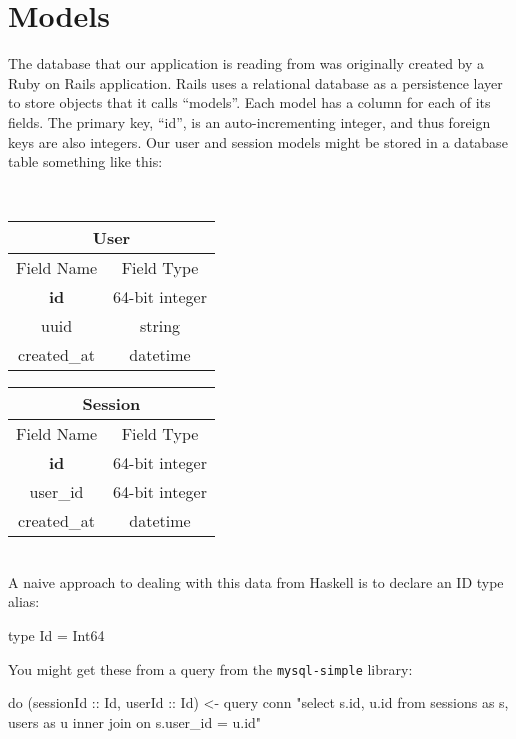 \documentclass{tmr}
\begin{document}
\section{Models}

The database that our application is reading from was originally created by a Ruby on Rails application.  Rails uses a relational database as a persistence layer to store objects that it calls ``models''.  Each model has a column for each of its fields.  The primary key, ``id'', is an auto-incrementing integer, and thus foreign keys are also integers.  Our user and session models might be stored in a database table something like this:

~\\

\begin{minipage}[c]{0.45\textwidth}
    \begin{tabular}{cc}
\multicolumn{2}{c}{User}\\ \hline
Field Name & Field Type \\ \hline
\textbf{id} & 64-bit integer \\
uuid & string \\
created\_at & datetime \\ \hline
\end{tabular}
\end{minipage}
\begin{minipage}[c]{0.45\textwidth}
\begin{tabular}{cc}
\multicolumn{2}{c}{Session}\\ \hline
Field Name & Field Type \\ \hline
\textbf{id} & 64-bit integer \\
user\_id & 64-bit integer \\
created\_at & datetime \\ \hline
\end{tabular}
\end{minipage}

~\\

A naive approach to dealing with this data from Haskell is to declare an ID type alias:

\begin{code}
type Id = Int64
\end{code}

You might get these from a query from the \texttt{mysql-simple} library:

\begin{code}
do (sessionId :: Id, userId :: Id) <- query conn "select s.id, u.id
      from sessions as s, users as u inner join on s.user_id = u.id"
\end{code}
\end{document}
